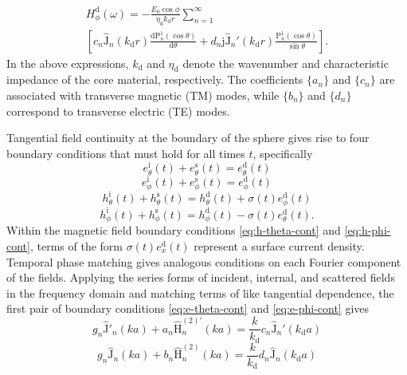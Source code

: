 \documentclass[article]{IEEEtran}
\newcommand{\T}[1]{\mathrm{#1}}
\newcommand{\Jh}{\hat{\T{J}}}
\newcommand{\Hh}{\hat{\T{H}}^{(2)}}
\newcommand{\Hhp}{\hat{\T{H}}^{(2)\prime}}
\begin{document}
\begin{multline}
    H_\phi^\T{d}(\omega) =  -\frac{E_0\cos\phi}{\eta_\T{d}k_\T{d}r}\sum_{n=1}^\infty\\\left[c_n\Jh_n(k_\T{d}r)\frac{\T{d}\T{P}_n^1(\cos\theta)}{\T{d}\theta} + d_n\T{j}\Jh_n'(k_\T{d}r)\frac{\T{P}^1_n(\cos\theta)}{\sin\theta}\right].
\end{multline}
In the above expressions, $k_\T{d}$ and $\eta_\T{d}$ denote the wavenumber and characteristic impedance of the core material, respectively.  The coefficients $\{a_n\}$ and $\{c_n\}$ are associated with transverse magnetic (TM) modes, while $\{b_n\}$ and $\{d_n\}$ correspond to transverse electric (TE) modes. 

Tangential field continuity at the boundary of the sphere gives rise to four boundary conditions that must hold for all times $t$, specifically
\begin{equation}
    e_\theta^\T{i}(t)+e_\theta^\T{s}(t)=
    e_\theta^\T{d}(t)
    \label{eq:e-theta-cont}
\end{equation}
\begin{equation}
    e_\phi^\T{i}(t)+e_\phi^\T{s}(t) = 
    e_\phi^\T{d} (t)
    \label{eq:e-phi-cont}
\end{equation}
\begin{equation}
    h_\theta^\T{i}(t)+h_\theta^\T{s}(t) = 
    h_\theta^\T{d}(t) + \sigma(t)e_\phi^\T{d}(t)
    \label{eq:h-theta-cont}
\end{equation}
\begin{equation}
    h_\phi^\T{i}(t)+h_\phi^\T{s}(t) = 
    h_\phi^\T{d}(t) - \sigma(t)e_\theta^\T{d}(t).
    \label{eq:h-phi-cont}
\end{equation}
Within the magnetic field boundary conditions \eqref{eq:h-theta-cont} and \eqref{eq:h-phi-cont}, terms of the form $\sigma(t)e_{x}^\T{d}(t)$ represent a surface current density. %
Temporal phase matching gives analogous conditions on each Fourier component of the fields.  Applying the series forms of incident, internal, and scattered fields in the frequency domain and matching terms of like tangential dependence, the first pair of boundary conditions \eqref{eq:e-theta-cont} and \eqref{eq:e-phi-cont} gives
\begin{equation}
    g_n\Jh'_n(ka) + a_n\Hhp_n(ka) = \frac{k}{k_\T{d}}c_n\Jh_n'(k_\T{d}a)
    \label{eq:bc-e-tm}
\end{equation}
\begin{equation}
    g_n\Jh_n(ka) + b_n\Hh_n(ka) =\frac{k}{k_\T{d}}d_n\Jh_n(k_\T{d}a)
\end{equation}
\end{document}
